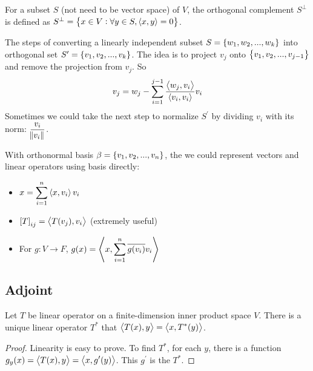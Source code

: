 \begin{definition}
    For a subset $S$ (not need to be vector space) of $V$, the orthogonal complement $S^\perp$ is defined as $S^\perp=\set{x \in V: \forall y \in S, \left\langle \displaystyle x, y \right\rangle = 0}$.
\end{definition}



\begin{theorem}\label{gram_schmidt_process}
    The steps of converting a linearly independent subset $S=\set{w_1, w_2, ..., w_k}$ into orthogonal set $S^\prime=\set{v_1, v_2, ..., v_k}$. The idea is to project $v_{j}$ onto $\set{v_1, v_2, ..., v_{j-1}}$ and remove the projection from $v_j$. So
    \begin{equation}
        v_j = w_j - \sum_{i=1}^{j-1} \frac{\left\langle \displaystyle w_j, v_i \right\rangle}{\left\langle \displaystyle v_i, v_i \right\rangle} v_i
    \end{equation}
    Sometimes we could take the next step to normalize $S^\prime$ by dividing $v_i$ with its norm: $\displaystyle \frac{v_i}{\norm{v_i}}$.
\end{theorem}

With orthonormal basis $\beta = \set{v_1, v_2, ..., v_n}$, the we could represent vectors and linear operators using basis directly:
\begin{itemize}
    \item $\displaystyle x = \sum_{i=1}^n \left\langle \displaystyle x, v_i \right\rangle v_i$
    \item $\coordinate{T}_{ij} = \innerproduct{T(v_j)}{v_i}$ (extremely useful)
    \item For $g: V \rightarrow F$, $g(x) = \left\langle \displaystyle x, \sum_{i=1}^n \overline{g(v_i)} v_i \right\rangle$
\end{itemize}


\subsection{Adjoint}


\begin{theorem}
    Let $T$ be linear operator on a finite-dimension inner product space $V$. There is a unique linear operator $T^*$ that $\left\langle \displaystyle T(x), y \right\rangle = \left\langle \displaystyle x, T^* (y) \right\rangle$.
\end{theorem}
\begin{proof}
    Linearity is easy to prove. To find $T^*$, for each $y$, there is a function $g_y (x) = \left\langle \displaystyle T(x), y \right\rangle = \left\langle \displaystyle x, g^\prime (y) \right\rangle$. This $g^\prime$ is the $T^*$.
\end{proof}

